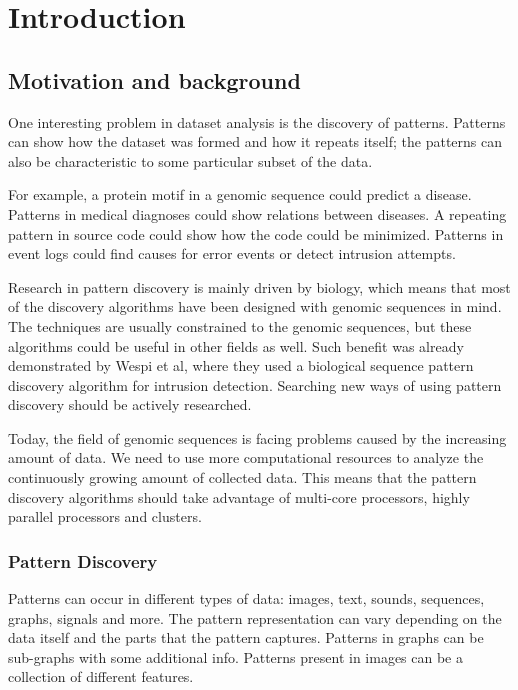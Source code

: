 \chapter{Introduction}
\label{c:introduction}

\section{Motivation and background}

One interesting problem in dataset analysis is the discovery of patterns. Patterns can show how the dataset was formed and how it repeats itself; the patterns can also be characteristic to some particular subset of the data.

For example, a protein motif in a genomic sequence could predict a disease. Patterns in medical diagnoses could show relations between diseases. A repeating pattern in source code could show how the code could be minimized. Patterns in event logs could find causes for error events or detect intrusion attempts.

Research in pattern discovery is mainly driven by biology, which means that most of the discovery algorithms have been designed with genomic sequences in mind. The techniques are usually constrained to the genomic sequences, but these algorithms could be useful in other fields as well. Such benefit was already demonstrated by Wespi et al\cite{IntrusionDetection}, where they used a biological sequence pattern discovery algorithm for intrusion detection. Searching new ways of using pattern discovery should be actively researched.

Today, the field of genomic sequences is facing problems caused by the increasing amount of data\cite{BigData,HowIsGenomeDoing}. We need to use more computational resources to analyze the continuously growing amount of collected data. This means that the pattern discovery algorithms should take advantage of multi-core processors, highly parallel processors and clusters.

\subsection{Pattern Discovery}

Patterns can occur in different types of data: images, text, sounds, sequences, graphs, signals and more. The pattern representation can vary depending on the data itself and the parts that the pattern captures. Patterns in graphs can be sub-graphs with some additional info. Patterns present in images can be a collection of different features.

